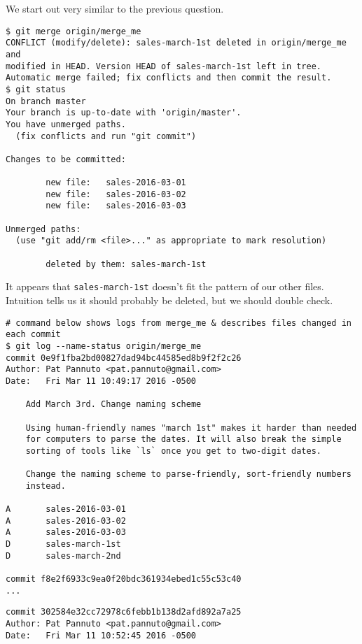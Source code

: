 \documentclass{article}
\begin{document}
{\color{violet}
    We start out very similar to the previous question.

    \begin{verbatim}
$ git merge origin/merge_me
CONFLICT (modify/delete): sales-march-1st deleted in origin/merge_me and
modified in HEAD. Version HEAD of sales-march-1st left in tree.
Automatic merge failed; fix conflicts and then commit the result.
$ git status
On branch master
Your branch is up-to-date with 'origin/master'.
You have unmerged paths.
  (fix conflicts and run "git commit")

Changes to be committed:

        new file:   sales-2016-03-01
        new file:   sales-2016-03-02
        new file:   sales-2016-03-03

Unmerged paths:
  (use "git add/rm <file>..." as appropriate to mark resolution)

        deleted by them: sales-march-1st
    \end{verbatim}

    It appears that \texttt{sales-march-1st} doesn't fit the pattern of our
    other files. Intuition tells us it should probably be deleted, but we
    should double check.
    
    \begin{verbatim}
# command below shows logs from merge_me & describes files changed in each commit
$ git log --name-status origin/merge_me 
commit 0e9f1fba2bd00827dad94bc44585ed8b9f2f2c26
Author: Pat Pannuto <pat.pannuto@gmail.com>
Date:   Fri Mar 11 10:49:17 2016 -0500

    Add March 3rd. Change naming scheme

    Using human-friendly names "march 1st" makes it harder than needed
    for computers to parse the dates. It will also break the simple
    sorting of tools like `ls` once you get to two-digit dates.

    Change the naming scheme to parse-friendly, sort-friendly numbers
    instead.

A       sales-2016-03-01
A       sales-2016-03-02
A       sales-2016-03-03
D       sales-march-1st
D       sales-march-2nd

commit f8e2f6933c9ea0f20bdc361934ebed1c55c53c40
...
\end{verbatim}
\newpage
\begin{verbatim}
commit 302584e32cc72978c6febb1b138d2afd892a7a25
Author: Pat Pannuto <pat.pannuto@gmail.com>
Date:   Fri Mar 11 10:52:45 2016 -0500


\end{verbatim}}
\end{document}
